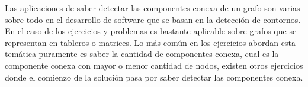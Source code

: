 Las aplicaciones de saber detectar las componentes conexa de un grafo son varias sobre todo en el desarrollo de software que se basan en la detección de contornos. En el caso de los ejercicios y problemas es bastante aplicable sobre grafos que se representan en tableros o matrices. Lo más común en los ejercicios abordan esta temática puramente es saber la cantidad de componentes conexa, cual es la componente conexa con mayor o menor cantidad de nodos, existen otros ejercicios donde el comienzo de la solución pasa por saber detectar las componentes conexa.